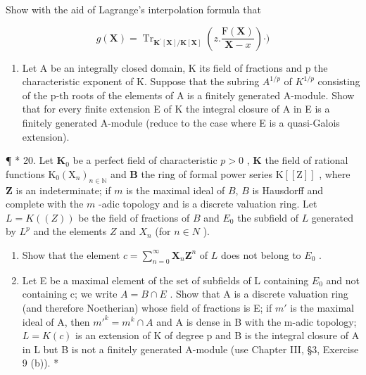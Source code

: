Show with the aid of Lagrange's interpolation formula that

\[
g (\mathbf {X}) = \operatorname{Tr} _ {\mathbf {K} ^ {\prime} [ \mathbf {X} ] / \mathbf {K} [ \mathbf {X} ]} \left(z. \frac {\mathrm{F} (\mathbf {X})}{\mathbf {X} - x}\right) \cdot)
\]

\begin{enumerate}
\def\labelenumi{(\alph{enumi})}
\setcounter{enumi}{1}
\tightlist
\item
  Let A be an integrally closed domain, K its field of fractions and p the characteristic exponent of K. Suppose that the subring \(A^{1/p}\) of \(K^{1/p}\) consisting of the p-th roots of the elements of A is a finitely generated A-module. Show that for every finite extension E of K the integral closure of A in E is a finitely generated A-module (reduce to the case where E is a quasi-Galois extension).
\end{enumerate}

¶ * 20. Let \(\mathbf{K}_0\) be a perfect field of characteristic \(p > 0\) , \(\mathbf{K}\) the field of rational functions \(\mathrm{K}_0(\mathrm{X}_n)_{n \in \mathbb{N}}\) and \(\mathbf{B}\) the ring of formal power series \(\mathrm{K}[[\mathrm{Z}]]\) , where \(\mathbf{Z}\) is an indeterminate; if \(m\) is the maximal ideal of \(B\), \(B\) is Hausdorff and complete with the \(m\) -adic topology and is a discrete valuation ring. Let \(L = K((Z))\) be the field of fractions of \(B\) and \(E_0\) the subfield of \(L\) generated by \(L^p\) and the elements \(Z\) and \(X_n\) (for \(n \in N\) ).

\begin{enumerate}
\def\labelenumi{(\alph{enumi})}
\item
  Show that the element \(c = \sum_{n=0}^{\infty} \mathbf{X}_n \mathbf{Z}^n\) of \(L\) does not belong to \(E_0\) .
\item
  Let E be a maximal element of the set of subfields of L containing \(E_{0}\) and not containing c; we write \(A = B \cap E\) . Show that A is a discrete valuation ring (and therefore Noetherian) whose field of fractions is E; if \(m'\) is the maximal ideal of A, then \(m'^{k} = m^{k} \cap A\) and A is dense in B with the m-adic topology; \(L = K(c)\) is an extension of K of degree p and B is the integral closure of A in L but B is not a finitely generated A-module (use Chapter III, §3, Exercise 9 (b)). *
\end{enumerate}

